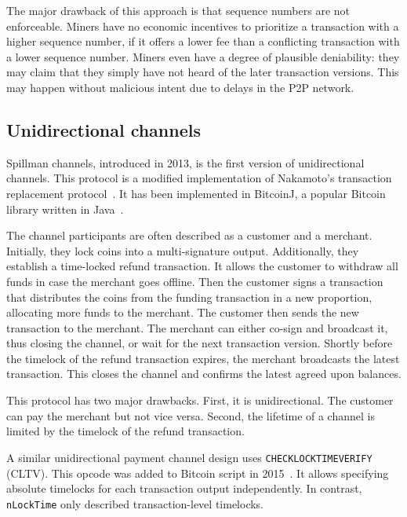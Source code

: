 The major drawback of this approach is that sequence numbers are not enforceable.
Miners have no economic incentives to prioritize a transaction with a higher sequence number, if it offers a lower fee than a conflicting transaction with a lower sequence number.
Miners even have a degree of plausible deniability: they may claim that they simply have not heard of the later transaction versions.
This may happen without malicious intent due to delays in the P2P network.


\subsection{Unidirectional channels}

Spillman channels, introduced in 2013, is the first version of unidirectional channels.
This protocol is a modified implementation of Nakamoto's transaction replacement protocol~\cite{Spillman2013}.
It has been implemented in BitcoinJ, a popular Bitcoin library written in Java~\cite{BitcoinJ}.

The channel participants are often described as a customer and a merchant.
Initially, they lock coins into a multi-signature output.
Additionally, they establish a time-locked refund transaction.
It allows the customer to withdraw all funds in case the merchant goes offline.
Then the customer signs a transaction that distributes the coins from the funding transaction in a new proportion, allocating more funds to the merchant.
The customer then sends the new transaction to the merchant. 
The merchant can either co-sign and broadcast it, thus closing the channel, or wait for the next transaction version.
Shortly before the timelock of the refund transaction expires, the merchant broadcasts the latest transaction.
This closes the channel and confirms the latest agreed upon balances.

This protocol has two major drawbacks.
First, it is unidirectional.
The customer can pay the merchant but not vice versa.
Second, the lifetime of a channel is limited by the timelock of the refund transaction.

A similar unidirectional payment channel design uses \texttt{CHECKLOCKTIMEVERIFY} (CLTV).
This opcode was added to Bitcoin script in 2015~\cite{Todd2014}.
It allows specifying absolute timelocks for each transaction output independently.
In contrast, \texttt{nLockTime} only described transaction-level timelocks.

